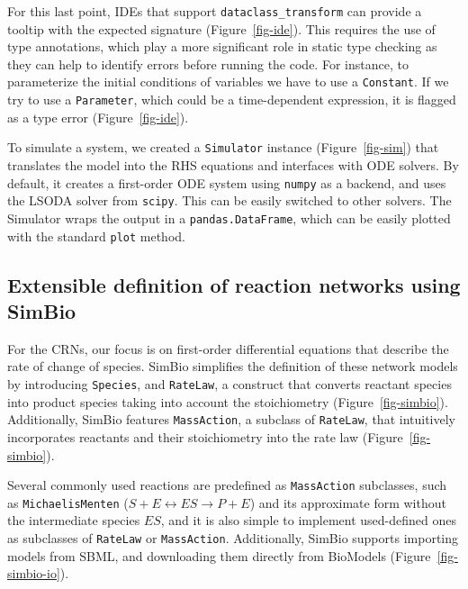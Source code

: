 \documentclass{article}
\begin{document}
For this last point,
\acp{IDE} that support \texttt{dataclass\_transform} \cite{debontePEP681Data2021}
can provide a tooltip with the expected signature (Figure~\ref{fig-ide}).
This requires the use of type annotations,
which play a more significant role in static type checking
as they can help to identify errors before running the code.
For instance, to parameterize the initial conditions of variables
we have to use a \texttt{Constant}.
If we try to use a \texttt{Parameter},
which could be a time-dependent expression,
it is flagged as a type error (Figure~\ref{fig-ide}).

To simulate a system,
we created a \texttt{Simulator} instance (Figure~\ref{fig-sim})
that translates the model into the \ac{RHS} equations
and interfaces with \ac{ODE} solvers.
By default,
it creates a first-order \ac{ODE} system using \texttt{numpy} as a backend,
and uses the LSODA solver from \texttt{scipy}.
This can be easily switched to other solvers.
The Simulator wraps the output in a \texttt{pandas.DataFrame},
which can be easily plotted with the standard \texttt{plot} method.

\hypertarget{extensible-definition-of-reaction-networks-using-simbio}{%
\subsection{Extensible definition of reaction networks using
SimBio}\label{extensible-definition-of-reaction-networks-using-simbio}}

For the \acp{CRN},
our focus is on first-order differential equations that describe the rate of change of species.
SimBio simplifies the definition of these network models by introducing \texttt{Species},
and \texttt{RateLaw}, a construct that converts reactant species into product species taking into account the stoichiometry (Figure~\ref{fig-simbio}).
Additionally, SimBio features \texttt{MassAction},
a subclass of \texttt{RateLaw},
that intuitively incorporates reactants and their stoichiometry into the rate law (Figure~\ref{fig-simbio}).

Several commonly used reactions are predefined as \texttt{MassAction} subclasses,
such as \texttt{MichaelisMenten} (\(S + E \leftrightarrow ES \rightarrow P + E\))
and its approximate form without the intermediate species \(ES\),
and it is also simple to implement used-defined ones
as subclasses of \texttt{RateLaw} or \texttt{MassAction}.
Additionally, SimBio supports importing models from \ac{SBML},
and downloading them directly from BioModels \cite{malik-sheriffBioModels15Years2020} (Figure~\ref{fig-simbio-io}).
\end{document}
